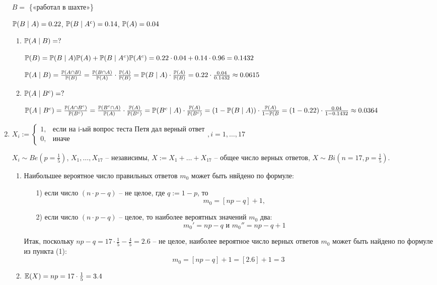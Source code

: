 \documentclass[12pt, a4paper]{article}\usepackage[]{graphicx}\usepackage[]{color}
\begin{document}
\begin{enumerate}
							$B=$ \{«работал в шахте»\}

							$\P (B \mid A) = 0.22$, $\P (B \mid A^c) = 0.14$, $\P (A) = 0.04$
							\begin{enumerate}
								\item $\P(A\mid B) = ?$

								$\P (B) = \P (B \mid A) \P(A) + \P (B \mid A^c) \P (A^c) = 0.22 \cdot 0.04 + 0.14 \cdot 0.96 = 0.1432$

								$\P(A \mid B) = \frac{\P(A\cap B)}{\P (B)} = \frac{\P (B \cap A)}{\P(A)} \cdot \frac{\P(A)}{\P (B)} = \P (B \mid A) \cdot \frac{\P(A)}{\P (B)} = 0.22 \cdot \frac{0.04}{0.1432} \approx 0.0615$

								\item $\P (A \mid B^c) = ? $

								$\P  (A \mid B^c) =  \frac{\P(A\cap B^c)}{\P (B^c)} =  \frac{\P (B^c \cap A)}{\P(A)} \cdot \frac{\P(A)}{\P (B^c)} = \P (B^c \mid A) \cdot \frac{\P(A)}{\P (B^c)} = (1-\P (B \mid A)) \cdot \frac{\P(A)}{1-\P (B} = (1-0.22) \cdot \frac{0.04}{1-0.1432} \approx 0.0364 $
							\end{enumerate}
							\item $X_i :=
							\begin{cases}
							1, & \text{если на i-ый вопрос теста Петя дал верный ответ} \\
							0, & \text{иначе}
							\end{cases},
							i = 1, \ldots, 17
							$

							$X_i \sim Be\left(p=\frac{1}{5}\right)$, $X_1, \ldots, X_{17}$ – независимы, $X:= X_1 + \ldots + X_{17}$ – общее число верных ответов, $X \sim Bi\left(n=17, p=\frac{1}{5}\right)$.
							\begin{enumerate}
								\item Наибольшее вероятное число правильных ответов $m_0$ может быть нвйдено по формуле:
								\begin{enumerate}
									\item[1)] если число $(n\cdot p - q)$ – не целое, где $q:=1-p$, то
									\[
									m_0 = [np-q] +1,
									\]
									\item[2)] если число  $(n\cdot p - q)$ – целое, то наиболее вероятных значений $m_0$ два:
									\[
									m_0' = np-q \text{ и } m_0'' = np-q+1
									\]
								\end{enumerate}
								Итак, поскольку $np-q = 17\cdot\frac{1}{5} - \frac{4}{5} = 2.6$ – не целое, наиболее вероятное число верных ответов $m_0$ может быть найдено по формуле из пункта (1):
								\[
								m_0 = [np-q] +1 = [2.6] + 1 = 3
								\]
								\item $\E(X) = np = 17 \cdot \frac{1}{5}=3.4$


\end{enumerate}
\end{enumerate}
\end{document}
